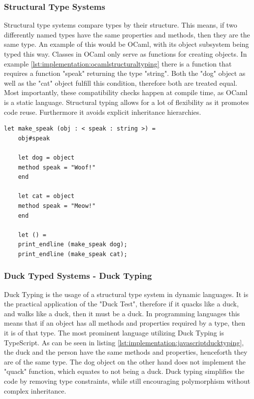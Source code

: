 \subsubsection{Structural Type Systems}

Structural type systems compare types by their structure. This means, if two differently named types have the same properties and methods, then they are the same type. An example of this would be OCaml, with its object subsystem being typed this way. Classes in OCaml only serve as functions for creating objects. In example \ref{lst:implementation:ocamlstructuraltyping} there is a function that requires a function "speak" returning the type "string". Both the "dog" object as well as the "cat" object fulfill this condition, therefore both are treated equal. Most importantly, these compatibility checks happen at compile time, as OCaml is a static language. Structural typing allows for a lot of flexibility as it promotes code reuse. Furthermore it avoids explicit inheritance hierarchies.

\begin{lstlisting}[language=caml,caption=Example of structural typing in Ocaml,label=lst:implementation:ocamlstructuraltyping]
	let make_speak (obj : < speak : string >) =
	obj#speak

	let dog = object
	method speak = "Woof!"
	end

	let cat = object
	method speak = "Meow!"
	end

	let () =
	print_endline (make_speak dog);
	print_endline (make_speak cat);
\end{lstlisting}

\subsubsection{Duck Typed Systems - Duck Typing}

Duck Typing is the usage of a structural type system in dynamic languages. It is the practical application of the "Duck Test", therefore if it quacks like a duck, and walks like a duck, then it must be a duck. In programming languages this means that if an object has all methods and properties required by a type, then it is of that type. The most prominent language utilizing Duck Typing is TypeScript. As can be seen in listing \ref{lst:implementation:javascriptducktyping}, the duck and the person have the same methods and properties, henceforth they are of the same type. The dog object on the other hand does not implement the "quack" function, which equates to not being a duck. Duck typing simplifies the code by removing type constraints, while still encouraging polymorphism without complex inheritance.


